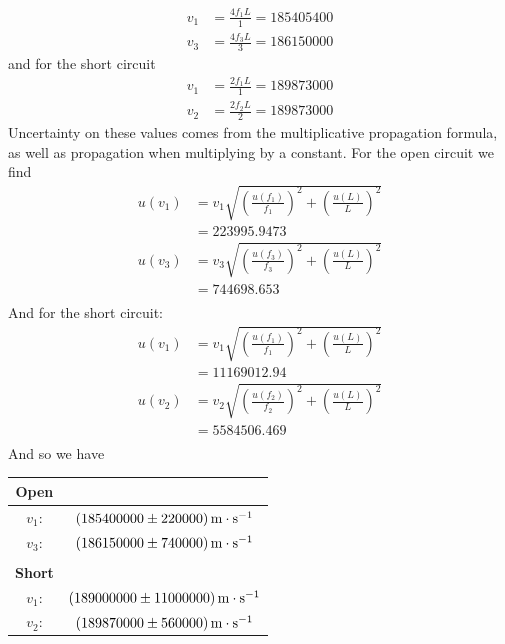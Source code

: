 \documentclass[12pt]{article}
\numberwithin{equation}{section}
\numberwithin{figure}{section}
\begin{document}
    \begin{align*}
        v_1&=\frac{4f_1L}{1}=185405400\\
        v_3&=\frac{4f_3L}{3}=186150000
    \end{align*}
    and for the short circuit
    \begin{align*}
        v_1&=\frac{2f_1L}{1}=189873000\\
        v_2&=\frac{2f_2L}{2}=189873000
    \end{align*}
    Uncertainty on these values comes from the multiplicative propagation formula, as well as 
    propagation when multiplying by a constant. For the open circuit we find
    \begin{align*}
        u(v_1)&=v_1\sqrt{\left(\frac{u(f_1)}{f_1}\right)^2+\left(\frac{u(L)}{L}\right)^2}\\
        &=223995.9473\\
        u(v_3)&=v_3\sqrt{\left(\frac{u(f_3)}{f_3}\right)^2+\left(\frac{u(L)}{L}\right)^2}\\
        &=744698.653\\
    \end{align*}
    And for the short circuit:
    \begin{align*}
        u(v_1)&=v_1\sqrt{\left(\frac{u(f_1)}{f_1}\right)^2+\left(\frac{u(L)}{L}\right)^2}\\
        &=11169012.94\\
        u(v_2)&=v_2\sqrt{\left(\frac{u(f_2)}{f_2}\right)^2+\left(\frac{u(L)}{L}\right)^2}\\
        &=5584506.469\\
    \end{align*}
    And so we have 
    \begin{table}[H]
        \centering
        \begin{tabular}{c c}
            \textbf{Open} & \\
            \hline
            $v_1$: & $\SI{185400000\pm220000}{\metre\cdot\second^{-1}}$\\
            $v_3$: & $\SI{186150000\pm740000}{\metre\cdot\second^{-1}}$\\
            \hspace{3pt} & \\
            \textbf{Short} & \\
            \hline
            $v_1$: & $\SI{189000000\pm11000000}{\metre\cdot\second^{-1}}$\\
            $v_2$: & $\SI{189870000\pm560000}{\metre\cdot\second^{-1}}$
        \end{tabular}
    \end{table}
    \noindent
\end{document}
